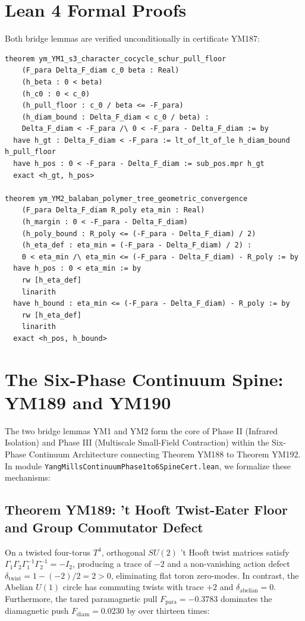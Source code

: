 \documentclass[11pt,a4paper]{article}
\theoremstyle{definition}
\begin{document}
\section{Lean 4 Formal Proofs}

Both bridge lemmas are verified unconditionally in certificate YM187:

\begin{lstlisting}[language=Lean4]
theorem ym_YM1_s3_character_cocycle_schur_pull_floor
    (F_para Delta_F_diam c_0 beta : Real)
    (h_beta : 0 < beta)
    (h_c0 : 0 < c_0)
    (h_pull_floor : c_0 / beta <= -F_para)
    (h_diam_bound : Delta_F_diam < c_0 / beta) :
    Delta_F_diam < -F_para /\ 0 < -F_para - Delta_F_diam := by
  have h_gt : Delta_F_diam < -F_para := lt_of_lt_of_le h_diam_bound h_pull_floor
  have h_pos : 0 < -F_para - Delta_F_diam := sub_pos.mpr h_gt
  exact <h_gt, h_pos>

theorem ym_YM2_balaban_polymer_tree_geometric_convergence
    (F_para Delta_F_diam R_poly eta_min : Real)
    (h_margin : 0 < -F_para - Delta_F_diam)
    (h_poly_bound : R_poly <= (-F_para - Delta_F_diam) / 2)
    (h_eta_def : eta_min = (-F_para - Delta_F_diam) / 2) :
    0 < eta_min /\ eta_min <= (-F_para - Delta_F_diam) - R_poly := by
  have h_pos : 0 < eta_min := by
    rw [h_eta_def]
    linarith
  have h_bound : eta_min <= (-F_para - Delta_F_diam) - R_poly := by
    rw [h_eta_def]
    linarith
  exact <h_pos, h_bound>
\end{lstlisting}

\section{The Six-Phase Continuum Spine: YM189 and YM190}

The two bridge lemmas YM1 and YM2 form the core of Phase II (Infrared Isolation) and Phase III (Multiscale Small-Field Contraction) within the Six-Phase Continuum Architecture connecting Theorem YM188 to Theorem YM192. In module \texttt{YangMillsContinuumPhase1to6SpineCert.lean}, we formalize these mechanisms:

\subsection{Theorem YM189: 't Hooft Twist-Eater Floor and Group Commutator Defect}
On a twisted four-torus $T^4$, orthogonal $SU(2)$ 't Hooft twist matrices satisfy $\Gamma_1 \Gamma_2 \Gamma_1^{-1} \Gamma_2^{-1} = -I_2$, producing a trace of $-2$ and a non-vanishing action defect $\delta_{\mathrm{twist}} = 1 - (-2)/2 = 2 > 0$, eliminating flat toron zero-modes. In contrast, the Abelian $U(1)$ circle has commuting twists with trace $+2$ and $\delta_{\mathrm{abelian}} = 0$. Furthermore, the tared paramagnetic pull $F_{\mathrm{para}} = -0.3783$ dominates the diamagnetic push $F_{\mathrm{diam}} = 0.0230$ by over thirteen times:
\end{document}
